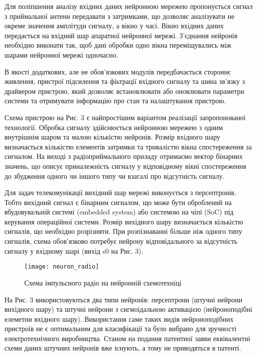 Для поліпшення аналізу вхідних даних нейронною мережею пропонується 
сигнал з приймальної антени передавати з затримками, що дозволяє 
аналізувати не окреме значення амплітуди сигналу, а вікно у часі. 
Вікно вхідних даних передається на вхідний шар апаратної нейронної мережі. 
З'єднання нейронів необхідно виконати так, щоб дані обробки одно вікна 
переміщувались між шарами нейронної мережі одночасно. 

В якості додаткових, але не обов'язкових модулів передбачається стороннє 
живлення, пристрої підсилення та фіьтрації вхідного сигналу та шина зв'язку 
з драйвером пристрою, який дозволяє встановлювати або оновлювати параметри 
системи та отримувати інформацію про стан та налаштування пристрою.

Схема пристрою на Рис. 3 є найпростішим варіантом реалізації 
запропонованої технології. Обробка сигналу здійснюється нейронною 
мережею з одним внутрішнім шаром та малою кількістю нейронів. Розмір 
вхідного шару визначається кількістю елементів затримки та тривалістю 
вікна спостереження за сигналом. На виході з радіоприймального приладу 
отримаємо вектор бінарних значень, що описує приналежність сигналу у 
відповідному вікні спостереження до збудження одного чи іншого типу чи 
взагалі про відсутність сигналу. 

Для задач телекомунікації вихідний шар мережі виконується з персептронів. 
Тобто вихідний сигнал є бінарним сигналом, що може бути оброблений на 
вбудовувальній системі (embedded system) або системою на чіпі (SoC) 
під керування операційної системи. Розмір вихідного шару визначається 
кількістю сигналів, що необхідно розрізняти. При розпізнаванні більше 
ніж одного типу сигналів, схема обов'язково потребує нейрону 
відповідального за відсутність сигналу у вхідному шарі 
(вихід s0 на Рис. 3).

\begin{figure}[htbp] \begin{center}
\texttt{[image: neuron\_radio]}
\caption{Схема імпульсного радіо на нейронній схемотехніці} 
\label{fig:neural_radio}
\end{center} \end{figure}

На Рис. 3 використовуються два типи нейронів: персептрони 
(штучні нейрони вихідного шару) та штучні нейрони з сигмоідальною 
активацією (нейроноподібні елеметни вхідного шару). Використання саме 
таких видів нейроноподібних пристроїв не є оптимальним для класифікації 
та було вибрано для зручності електротехнічного виробництва. Станом на 
подання патентної заяви еквівалентні схеми даних штучних нейронів вже 
існують, а тому не приводяться в патенті.

